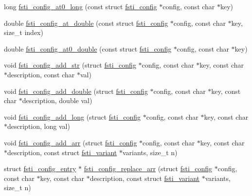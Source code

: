 \begin{DoxyCompactItemize}
\item 
long \mbox{\hyperlink{fsti-config_8h_a9f3d5723f366dc5de1ed8c23c32db499}{fsti\+\_\+config\+\_\+at0\+\_\+long}} (const struct \mbox{\hyperlink{structfsti__config}{fsti\+\_\+config}} $\ast$config, const char $\ast$key)
\item 
double \mbox{\hyperlink{fsti-config_8h_a62f94d64fed8d92993151b3fcbfa6a3f}{fsti\+\_\+config\+\_\+at\+\_\+double}} (const struct \mbox{\hyperlink{structfsti__config}{fsti\+\_\+config}} $\ast$config, const char $\ast$key, size\+\_\+t index)
\item 
double \mbox{\hyperlink{fsti-config_8h_a3e479a269882550f86538865a4c76d1e}{fsti\+\_\+config\+\_\+at0\+\_\+double}} (const struct \mbox{\hyperlink{structfsti__config}{fsti\+\_\+config}} $\ast$config, const char $\ast$key)
\item 
void \mbox{\hyperlink{fsti-config_8h_a3ee06dfcfc2e683469ca7ed25f9dc7a4}{fsti\+\_\+config\+\_\+add\+\_\+str}} (struct \mbox{\hyperlink{structfsti__config}{fsti\+\_\+config}} $\ast$config, const char $\ast$key, const char $\ast$description, const char $\ast$val)
\item 
void \mbox{\hyperlink{fsti-config_8h_ac687fc8ca6887aae337ce8ef4188f089}{fsti\+\_\+config\+\_\+add\+\_\+double}} (struct \mbox{\hyperlink{structfsti__config}{fsti\+\_\+config}} $\ast$config, const char $\ast$key, const char $\ast$description, double val)
\item 
void \mbox{\hyperlink{fsti-config_8h_aeeb0d90b0edb706662e123f6747b2a3c}{fsti\+\_\+config\+\_\+add\+\_\+long}} (struct \mbox{\hyperlink{structfsti__config}{fsti\+\_\+config}} $\ast$config, const char $\ast$key, const char $\ast$description, long val)
\item 
void \mbox{\hyperlink{fsti-config_8h_a5d0a69eb0415adc0b32d29a92c002890}{fsti\+\_\+config\+\_\+add\+\_\+arr}} (struct \mbox{\hyperlink{structfsti__config}{fsti\+\_\+config}} $\ast$config, const char $\ast$key, const char $\ast$description, const struct \mbox{\hyperlink{structfsti__variant}{fsti\+\_\+variant}} $\ast$variants, size\+\_\+t n)
\item 
struct \mbox{\hyperlink{structfsti__config__entry}{fsti\+\_\+config\+\_\+entry}} $\ast$ \mbox{\hyperlink{fsti-config_8h_ac8ebb30eef8cc1e532c95a9bb31e0853}{fsti\+\_\+config\+\_\+replace\+\_\+arr}} (struct \mbox{\hyperlink{structfsti__config}{fsti\+\_\+config}} $\ast$config, const char $\ast$key, const char $\ast$description, const struct \mbox{\hyperlink{structfsti__variant}{fsti\+\_\+variant}} $\ast$variants, size\+\_\+t n)
\item 

\end{DoxyCompactItemize}
